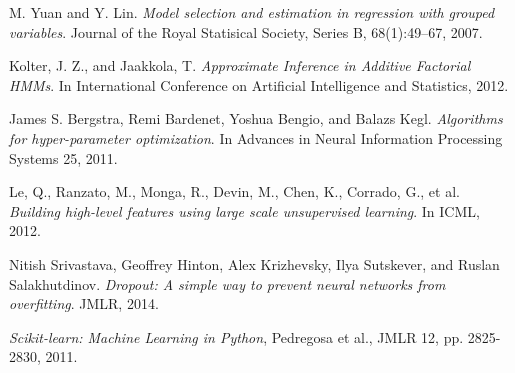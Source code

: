\begin{thebibliography}{9}

M. Yuan and Y. Lin. \emph{Model selection and estimation in regression with grouped variables}. 
Journal of the Royal Statisical Society, Series B, 68(1):49–67, 2007.

Kolter, J. Z., and Jaakkola, T. \emph{Approximate Inference in Additive Factorial HMMs}. In International Conference on Artificial Intelligence and Statistics, 2012.

James S. Bergstra, Remi Bardenet, Yoshua Bengio, and Balazs Kegl. \emph{Algorithms for hyper-parameter optimization}. In Advances in Neural Information Processing Systems 25, 2011.

Le, Q., Ranzato, M., Monga, R., Devin, M., Chen, K., Corrado, G., et al. \emph{Building high-level features using large scale unsupervised learning}. In ICML, 2012.

Nitish Srivastava, Geoffrey Hinton, Alex Krizhevsky, Ilya Sutskever, and Ruslan Salakhutdinov.
\emph{Dropout: A simple way to prevent neural networks from overfitting}. JMLR, 2014.

\emph{Scikit-learn: Machine Learning in Python}, Pedregosa et al., JMLR 12, pp. 2825-2830, 2011.


\end{thebibliography}

